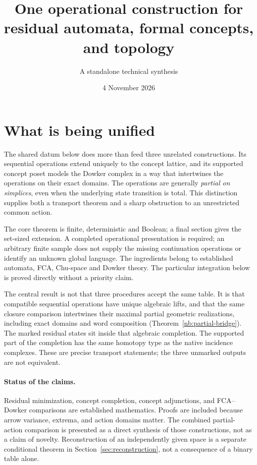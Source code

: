 \documentclass[11pt]{article}
\title{One operational construction for residual automata,
formal concepts, and topology}
\author{A standalone technical synthesis}
\date{4 November 2026}
\theoremstyle{remark}
\begin{document}
\maketitle
\section{What is being unified}
\label{nb:section}

The shared datum below does more than feed three unrelated constructions.
Its sequential operations extend uniquely to the concept lattice, and its
supported concept poset models the Dowker complex in a way that intertwines
the operations on their exact domains. The operations are generally
\emph{partial on simplices}, even when the underlying state transition is
total. This distinction supplies both a transport theorem and a sharp
obstruction to an unrestricted common action.

The core theorem is finite, deterministic and Boolean; a final section gives
the set-sized extension. A completed operational
presentation is required; an arbitrary finite sample does not supply the
missing continuation operations or identify an unknown global language.
The ingredients belong to established automata, FCA, Chu-space and Dowker
theory. The particular integration below is proved directly without a
priority claim.


The central result is not that three procedures accept the same table.
It is that compatible sequential operations have unique algebraic lifts,
and that the same closure comparison intertwines their maximal partial
geometric realizations, including exact domains and word composition
(Theorem~\ref{nb:partial-bridge}). The marked residual states sit inside
that algebraic completion. The supported part of the completion has the
same homotopy type as the native incidence complexes. These are precise
transport statements; the three unmarked outputs are not equivalent.

\paragraph{Status of the claims.}
Residual minimization, concept completion, concept adjunctions, and
FCA--Dowker comparisons are established mathematics. Proofs are included
because arrow variance, extrema, and action domains matter. The combined
partial-action comparison is presented as a direct synthesis of those
constructions, not as a claim of novelty. Reconstruction of an independently
given space is a separate conditional theorem in
Section~\ref{sec:reconstruction}, not a consequence of a binary table alone.
\end{document}
